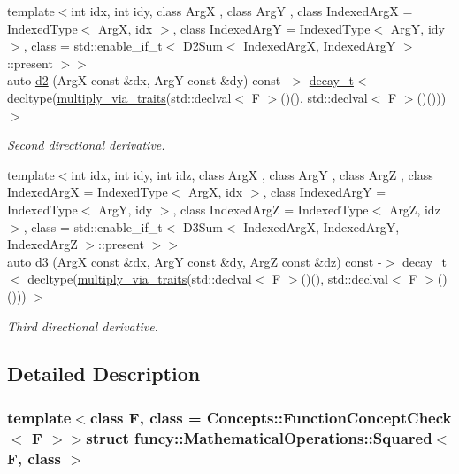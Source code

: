 \begin{DoxyCompactItemize}
{\footnotesize template$<$int idx, int idy, class Arg\-X , class Arg\-Y , class Indexed\-Arg\-X  = Indexed\-Type$<$ Arg\-X, idx $>$, class Indexed\-Arg\-Y  = Indexed\-Type$<$ Arg\-Y, idy $>$, class  = std\-::enable\-\_\-if\-\_\-t$<$ D2\-Sum$<$ Indexed\-Arg\-X, Indexed\-Arg\-Y $>$\-::present $>$$>$ }\\auto \hyperlink{structfuncy_1_1MathematicalOperations_1_1Squared_a9b0bc3d5e0a3b06614573eff5d7217ef}{d2} (Arg\-X const \&dx, Arg\-Y const \&dy) const -\/$>$ \hyperlink{namespacefuncy_ab4930ccd94b2ac4d9ee9069453f30c84}{decay\-\_\-t}$<$ decltype(\hyperlink{namespacefuncy_a804d61bb279c15a77dc98956e663feaf}{multiply\-\_\-via\-\_\-traits}(std\-::declval$<$ F $>$()(), std\-::declval$<$ F $>$()())) $>$
\begin{DoxyCompactList}\small\item\em Second directional derivative. \end{DoxyCompactList}\item 
{\footnotesize template$<$int idx, int idy, int idz, class Arg\-X , class Arg\-Y , class Arg\-Z , class Indexed\-Arg\-X  = Indexed\-Type$<$ Arg\-X, idx $>$, class Indexed\-Arg\-Y  = Indexed\-Type$<$ Arg\-Y, idy $>$, class Indexed\-Arg\-Z  = Indexed\-Type$<$ Arg\-Z, idz $>$, class  = std\-::enable\-\_\-if\-\_\-t$<$                           D3\-Sum$<$ Indexed\-Arg\-X, Indexed\-Arg\-Y, Indexed\-Arg\-Z $>$\-::present $>$$>$ }\\auto \hyperlink{structfuncy_1_1MathematicalOperations_1_1Squared_a793b9d6a949ad59856d3f8641127885c}{d3} (Arg\-X const \&dx, Arg\-Y const \&dy, Arg\-Z const \&dz) const -\/$>$ \hyperlink{namespacefuncy_ab4930ccd94b2ac4d9ee9069453f30c84}{decay\-\_\-t}$<$ decltype(\hyperlink{namespacefuncy_a804d61bb279c15a77dc98956e663feaf}{multiply\-\_\-via\-\_\-traits}(std\-::declval$<$ F $>$()(), std\-::declval$<$ F $>$()())) $>$
\begin{DoxyCompactList}\small\item\em Third directional derivative. \end{DoxyCompactList}\end{DoxyCompactItemize}


\subsection{Detailed Description}
\subsubsection*{template$<$class F, class = Concepts\-::\-Function\-Concept\-Check$<$ F $>$$>$struct funcy\-::\-Mathematical\-Operations\-::\-Squared$<$ F, class $>$}

